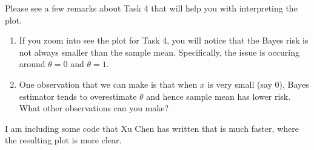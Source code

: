 \documentclass[
]{article}
\begin{document}
Please see a few remarks about Task 4 that will help you with
interpreting the plot.

\begin{enumerate}
\item If you zoom into see the plot for Task 4, you will notice that the Bayes risk is not always smaller than the sample mean. Specifically, the issue is occuring around $\theta = 0$ and $\theta = 1.$
\item One observation that we can make is that when $x$ is very small (say 0), Bayes estimator tends to overestimate $\theta$ and hence sample mean has lower risk. What other observations can you make? 
\end{enumerate}

I am including some code that Xu Chen has written that is much faster,
where the resulting plot is more clear.
\end{document}
